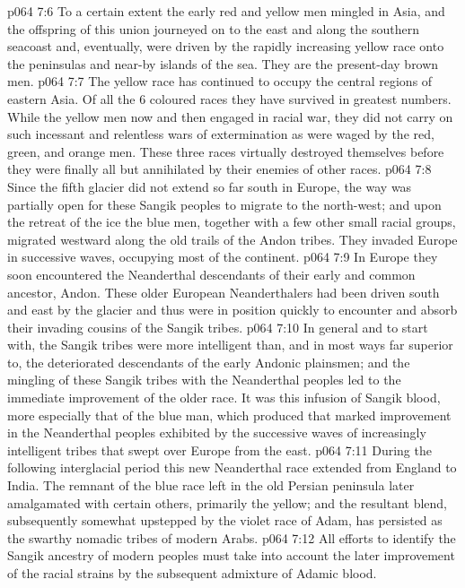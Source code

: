 \vs p064 7:6 To a certain extent the early red and yellow men mingled in Asia, and the offspring of this union journeyed on to the east and along the southern seacoast and, eventually, were driven by the rapidly increasing yellow race onto the peninsulas and near\hyp{}by islands of the sea. They are the present\hyp{}day brown men.
\vs p064 7:7 The yellow race has continued to occupy the central regions of eastern Asia. Of all the 6 coloured races they have survived in greatest numbers. While the yellow men now and then engaged in racial war, they did not carry on such incessant and relentless wars of extermination as were waged by the red, green, and orange men. These three races virtually destroyed themselves before they were finally all but annihilated by their enemies of other races.
\vs p064 7:8 Since the fifth glacier did not extend so far south in Europe, the way was partially open for these Sangik peoples to migrate to the north\hyp{}west; and upon the retreat of the ice the blue men, together with a few other small racial groups, migrated westward along the old trails of the Andon tribes. They invaded Europe in successive waves, occupying most of the continent.
\vs p064 7:9 In Europe they soon encountered the Neanderthal descendants of their early and common ancestor, Andon. These older European Neanderthalers had been driven south and east by the glacier and thus were in position quickly to encounter and absorb their invading cousins of the Sangik tribes.
\vs p064 7:10 In general and to start with, the Sangik tribes were more intelligent than, and in most ways far superior to, the deteriorated descendants of the early Andonic plainsmen; and the mingling of these Sangik tribes with the Neanderthal peoples led to the immediate improvement of the older race. It was this infusion of Sangik blood, more especially that of the blue man, which produced that marked improvement in the Neanderthal peoples exhibited by the successive waves of increasingly intelligent tribes that swept over Europe from the east.
\vs p064 7:11 During the following interglacial period this new Neanderthal race extended from England to India. The remnant of the blue race left in the old Persian peninsula later amalgamated with certain others, primarily the yellow; and the resultant blend, subsequently somewhat upstepped by the violet race of Adam, has persisted as the swarthy nomadic tribes of modern Arabs.
\vs p064 7:12 \pc All efforts to identify the Sangik ancestry of modern peoples must take into account the later improvement of the racial strains by the subsequent admixture of Adamic blood.
